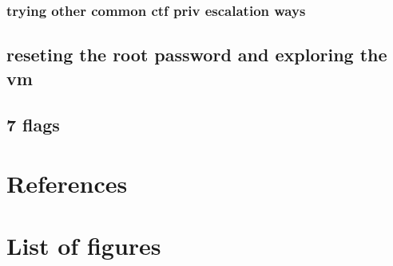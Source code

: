 \documentclass[a4paper]{article}
\begin{document}
\subsubsection{trying other common ctf priv escalation ways}
\subsection{reseting the root password and exploring the vm}
\subsection{7 flags}
\newpage
\section{References}

\newpage
\section{List of figures}

\listoffigures
\end{document}
